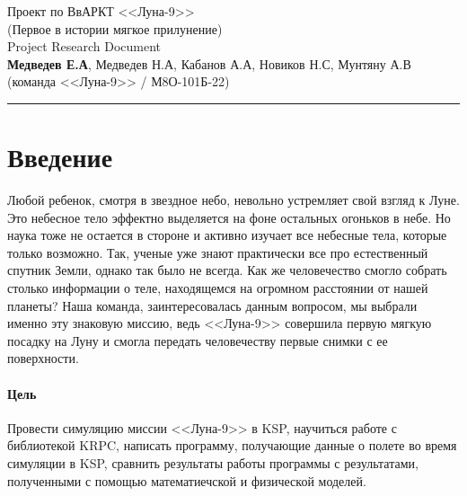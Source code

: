 


\begin{center}
	\huge{Проект по ВвАРКТ <<Луна-9>>} \\
	\large{(Первое в истории мягкое прилунение)} \\
	\Large{Project Research Document}\\
	\large{\textbf{Медведев Е.А}, Медведев Н.А, Кабанов А.А, Новиков Н.С, Мунтяну А.В} \\
	\large{(команда <<Луна-9>> / М8О-101Б-22)}
	\rule{\textwidth}{0.1pt}
\end{center}

\section*{Введение}
\noindent Любой ребенок, смотря в звездное небо, невольно устремляет свой взгляд к Луне. Это небесное тело эффектно выделяется на фоне остальных огоньков в небе. Но наука тоже не остается в стороне и активно изучает все небесные тела, которые только возможно. Так, ученые уже знают практически все про естественный спутник Земли, однако так было не всегда. Как же человечество смогло собрать столько информации о теле, находящемся на огромном расстоянии от нашей планеты? Наша команда, заинтересовалась данным вопросом,  мы выбрали именно эту знаковую миссию, ведь <<Луна-9>> совершила первую мягкую посадку на Луну и смогла передать человечеству первые снимки с ее поверхности. 
\paragraph{Цель} Провести симуляцию миссии <<Луна-9>> в KSP, научиться работе с библиотекой KRPC, написать программу, получающие данные о полете во время симуляции в KSP, сравнить результаты работы программы с результатами, полученными с помощью математиечской и физической моделей.
